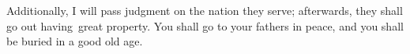 \begin{inparaenum}
     Additionally, I will pass judgment on the nation they serve; afterwards, they shall go out having\understood\ great property.%
     You shall go to your fathers in peace, and you shall be buried in a good old age.%
\end{inparaenum}
